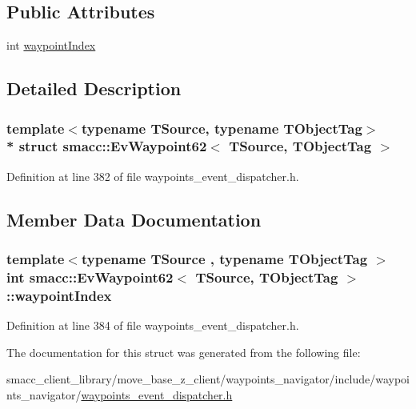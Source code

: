 \subsection*{Public Attributes}
\begin{DoxyCompactItemize}
\item 
int \hyperlink{structsmacc_1_1EvWaypoint62_ab995a0428e35cce65d3f75b642739b5a}{waypoint\+Index}
\end{DoxyCompactItemize}


\subsection{Detailed Description}
\subsubsection*{template$<$typename T\+Source, typename T\+Object\+Tag$>$\\*
struct smacc\+::\+Ev\+Waypoint62$<$ T\+Source, T\+Object\+Tag $>$}



Definition at line 382 of file waypoints\+\_\+event\+\_\+dispatcher.\+h.



\subsection{Member Data Documentation}
\subsubsection[{\texorpdfstring{waypoint\+Index}{waypointIndex}}]{\setlength{\rightskip}{0pt plus 5cm}template$<$typename T\+Source , typename T\+Object\+Tag $>$ int {\bf smacc\+::\+Ev\+Waypoint62}$<$ T\+Source, T\+Object\+Tag $>$\+::waypoint\+Index}\hypertarget{structsmacc_1_1EvWaypoint62_ab995a0428e35cce65d3f75b642739b5a}{}\label{structsmacc_1_1EvWaypoint62_ab995a0428e35cce65d3f75b642739b5a}


Definition at line 384 of file waypoints\+\_\+event\+\_\+dispatcher.\+h.



The documentation for this struct was generated from the following file\+:\begin{DoxyCompactItemize}
\item 
smacc\+\_\+client\+\_\+library/move\+\_\+base\+\_\+z\+\_\+client/waypoints\+\_\+navigator/include/waypoints\+\_\+navigator/\hyperlink{waypoints__event__dispatcher_8h}{waypoints\+\_\+event\+\_\+dispatcher.\+h}\end{DoxyCompactItemize}

